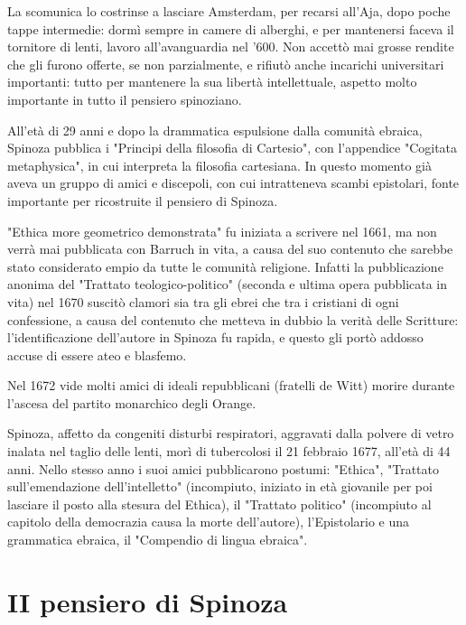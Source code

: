 \documentclass[a4paper,12pt,notitlepage]{report}
\begin{document}
	La scomunica lo costrinse a lasciare Amsterdam, per recarsi all'Aja, dopo poche tappe intermedie: dormì sempre in camere di alberghi, e per mantenersi faceva il tornitore di lenti, lavoro all'avanguardia nel '600. Non accettò mai grosse rendite che gli furono offerte, se non parzialmente, e rifiutò anche incarichi universitari importanti: tutto per mantenere la sua libertà intellettuale, aspetto molto importante in tutto il pensiero spinoziano.
	
	All'età di 29 anni e dopo la drammatica espulsione dalla comunità ebraica, Spinoza pubblica i "Principi della filosofia di Cartesio", con l'appendice "Cogitata metaphysica", in cui interpreta la filosofia cartesiana. In questo momento già aveva un gruppo di amici e discepoli, con cui intratteneva scambi epistolari, fonte importante per ricostruite il pensiero di Spinoza.
	
	"Ethica more geometrico demonstrata" fu iniziata a scrivere nel 1661, ma non verrà mai pubblicata con Barruch in vita, a causa del suo contenuto che sarebbe stato considerato empio da tutte le comunità religione. Infatti la pubblicazione anonima del "Trattato teologico-politico" (seconda e ultima opera pubblicata in vita) nel 1670 suscitò clamori sia tra gli ebrei che tra i cristiani di ogni confessione, a causa del contenuto che metteva in dubbio la verità delle Scritture: l'identificazione dell'autore in Spinoza fu rapida, e questo gli portò addosso accuse di essere ateo e blasfemo.
	
	Nel 1672 vide molti amici di ideali repubblicani (fratelli de Witt) morire durante l'ascesa del partito monarchico degli Orange.
	
	Spinoza, affetto da congeniti disturbi respiratori, aggravati dalla polvere di vetro inalata nel taglio delle lenti, morì di tubercolosi il 21 febbraio 1677, all'età di 44 anni. Nello stesso anno i suoi amici pubblicarono postumi: "Ethica", "Trattato sull'emendazione dell'intelletto" (incompiuto, iniziato in età giovanile per poi lasciare il posto alla stesura del Ethica), il "Trattato politico" (incompiuto al capitolo della democrazia causa la morte dell'autore), l'Epistolario e una grammatica ebraica, il "Compendio di lingua ebraica".
	
	\chapter*{II pensiero di Spinoza}
	
	
	
\end{document}
